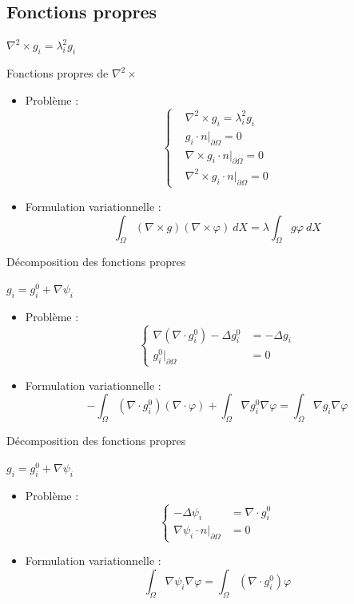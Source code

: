 \documentclass{beamer}
\newcommand{\grad}{{\nabla}}
\newcommand{\laplace}{{\Delta}}
\newcommand{\rot}{{\nabla\times}}
\newcommand{\rott}{{\nabla^2\times}}
\newcommand{\diverg}{{\nabla\cdot}}
\newcommand{\restr}{{\big\rvert_{\partial\Omega}}}
\begin{document}
\subsection{Fonctions propres}
\begin{frame}{$\rott  g_i = \lambda_i^2 g_i$}
\begin{block}{Fonctions propres de $\rott$}
\begin{itemize}
\item Problème :
\[
\left\{
\begin{aligned}
&\rott  g_i = \lambda_i^2 g_i\\
&g_i\cdot n\restr = 0\\
&\rot g_i\cdot n\restr = 0\\
&\rott  g_i\cdot n\restr = 0
\end{aligned}
\right.
\]
\item Formulation variationnelle :
\[
\int_\Omega (\rot g)(\rot\varphi)\ dX = \lambda\int_\Omega g\varphi\ dX
\]
\end{itemize}
\end{block}
\end{frame}

\begin{frame}{Décomposition des fonctions propres}
\begin{block}{$g_i=g_i^0+\grad\psi_i$}
\begin{itemize}
\item Problème :
\[
\left\{
\begin{aligned}
\grad(\diverg g_i^0)-\laplace g_i^0 &= -\laplace g_i\\
g_i^0\restr &= 0
\end{aligned}
\right.
\]
\item Formulation variationnelle :
\[
-\int_\Omega (\diverg g_i^0)(\diverg\varphi) + \int_\Omega \grad g_i^0\grad\varphi = \int_\Omega \grad g_i\grad\varphi
\]
\end{itemize}
\end{block}
\end{frame}

\begin{frame}{Décomposition des fonctions propres}
\begin{block}{$g_i=g_i^0+\grad\psi_i$}
\begin{itemize}
\item Problème :
\[
\left\{
\begin{aligned}
-\laplace\psi_i &= \diverg g_i^0\\
\grad\psi_i\cdot n\restr &= 0
\end{aligned}
\right.
\]
\item Formulation variationnelle :
\[
\int_\Omega \grad\psi_i\grad\varphi = \int_\Omega (\diverg g_i^0)\varphi\]
\end{itemize}
\end{block}
\end{frame}
\end{document}
